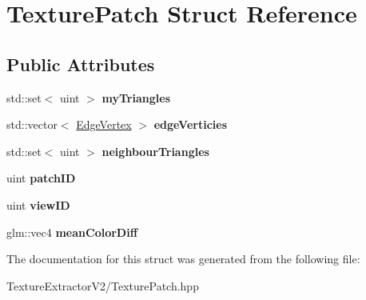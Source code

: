 \hypertarget{struct_texture_patch}{}\section{Texture\+Patch Struct Reference}
\label{struct_texture_patch}
\subsection*{Public Attributes}
\begin{DoxyCompactItemize}
\item 
\hypertarget{struct_texture_patch_a6508eab52b765ffa3f5b185956334f47}{}std\+::set$<$ uint $>$ {\bfseries my\+Triangles}\label{struct_texture_patch_a6508eab52b765ffa3f5b185956334f47}

\item 
\hypertarget{struct_texture_patch_a93366f5b9cc0d02ba08ffb4fba64d977}{}std\+::vector$<$ \hyperlink{struct_edge_vertex}{Edge\+Vertex} $>$ {\bfseries edge\+Verticies}\label{struct_texture_patch_a93366f5b9cc0d02ba08ffb4fba64d977}

\item 
\hypertarget{struct_texture_patch_a002b3455ab2599b42b78c34c1d887f94}{}std\+::set$<$ uint $>$ {\bfseries neighbour\+Triangles}\label{struct_texture_patch_a002b3455ab2599b42b78c34c1d887f94}

\item 
\hypertarget{struct_texture_patch_a359bb72c7d9793ff22e9d6272b016521}{}uint {\bfseries patch\+I\+D}\label{struct_texture_patch_a359bb72c7d9793ff22e9d6272b016521}

\item 
\hypertarget{struct_texture_patch_a97acb0ad9531af6cc0c366640d3575e1}{}uint {\bfseries view\+I\+D}\label{struct_texture_patch_a97acb0ad9531af6cc0c366640d3575e1}

\item 
\hypertarget{struct_texture_patch_a1285c94f40ae56464f33eaf69fb93617}{}glm\+::vec4 {\bfseries mean\+Color\+Diff}\label{struct_texture_patch_a1285c94f40ae56464f33eaf69fb93617}

\end{DoxyCompactItemize}


The documentation for this struct was generated from the following file\+:\begin{DoxyCompactItemize}
\item 
Texture\+Extractor\+V2/Texture\+Patch.\+hpp\end{DoxyCompactItemize}
